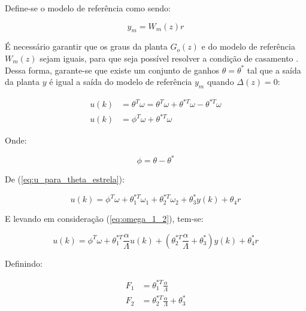     Define-se o modelo de referência como sendo:

    \begin{equation*}
        y_m = W_m(z) r
    \end{equation*}

    É necessário garantir que os graus da planta $G_o(z)$ e do modelo de referência $W_m(z)$ sejam
    iguais, para que seja possível resolver a condição de casamento \cite{ref:IOANNOU}. Dessa forma,
    garante-se que existe um conjunto de ganhos $\theta = \theta^*$ tal que a saída da planta $y$ é
    igual a saída do modelo de referência $y_m$ quando $\Delta(z) = 0$:

    \begin{equation}
        \begin{split}
            u(k) &= \theta^T \omega = \theta^T \omega + \theta^{*T} \omega - \theta^{*T} \omega\\
            u(k) &= \phi^T \omega + \theta^{*T} \omega
            \label{eq:u_para_theta_estrela}
        \end{split}
    \end{equation}

    Onde:

    \begin{equation*}
        \phi = \theta - \theta^*
    \end{equation*}

    De (\ref{eq:u_para_theta_estrela}):

    \begin{equation*}
        u(k) = \phi^T \omega + \theta_1^{*T} \omega_1 + \theta_2^{*T} \omega_2 + \theta_3^* y(k) + \theta_4 r
    \end{equation*}

    E levando em consideração (\ref{eq:omega_1_2}), tem-se:

    \begin{equation*}
        u(k) = \phi^T \omega + \theta_1^{*T} \frac{\alpha}{\Lambda} u(k)  + \left( \theta_2^{*T} \frac{\alpha}{\Lambda}
            + \theta_3^* \right) y(k) + \theta_4^* r
    \end{equation*}

    Definindo:

    \begin{equation*}
        \begin{split}
            F_1 &= \theta_1^{*T} \frac{\alpha}{\Lambda}\\
            F_2 &= \theta_2^{*T} \frac{\alpha}{\Lambda} + \theta_3^*
        \end{split}
    \end{equation*}

